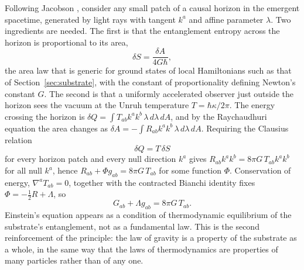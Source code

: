 \documentclass[aps,prd,onecolumn,nofootinbib,superscriptaddress]{revtex4-2}
\begin{document}
Following Jacobson \cite{jacobson1995}, consider any small patch of a causal horizon in the emergent spacetime, generated by light rays with tangent $k^a$ and affine parameter $\lambda$. Two ingredients are needed. The first is that the entanglement entropy across the horizon is proportional to its area,
\begin{equation}
\delta S = \frac{\delta A}{4G\hbar},
\label{eq:area}
\end{equation}
the area law that is generic for ground states of local Hamiltonians such as that of Section~\ref{sec:substrate}, with the constant of proportionality defining Newton's constant $G$. The second is that a uniformly accelerated observer just outside the horizon sees the vacuum at the Unruh temperature $T = \hbar\kappa/2\pi$. The energy crossing the horizon is $\delta Q = \int T_{ab}k^a k^b\,\lambda\,d\lambda\,dA$, and by the Raychaudhuri equation the area changes as $\delta A = -\int R_{ab}k^ak^b\,\lambda\,d\lambda\,dA$. Requiring the Clausius relation
\begin{equation}
\delta Q = T\,\delta S
\end{equation}
for every horizon patch and every null direction $k^a$ gives $R_{ab}k^ak^b = 8\pi G\,T_{ab}k^ak^b$ for all null $k^a$, hence $R_{ab} + \Phi g_{ab} = 8\pi G\,T_{ab}$ for some function $\Phi$. Conservation of energy, $\nabla^aT_{ab}=0$, together with the contracted Bianchi identity fixes $\Phi = -\tfrac12 R + \Lambda$, so
\begin{equation}
G_{ab} + \Lambda g_{ab} = 8\pi G\,T_{ab}.
\end{equation}
Einstein's equation appears as a condition of thermodynamic equilibrium of the substrate's entanglement, not as a fundamental law. This is the second reinforcement of the principle: the law of gravity is a property of the substrate as a whole, in the same way that the laws of thermodynamics are properties of many particles rather than of any one.
\end{document}

